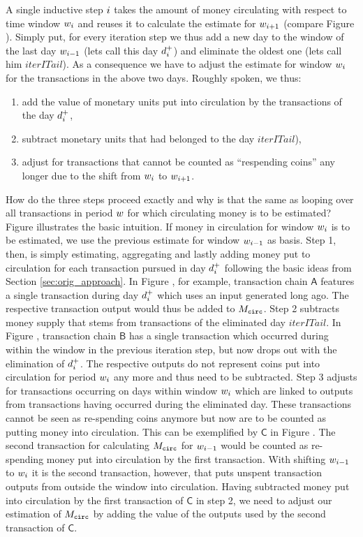 A single inductive step \({i}\) takes the amount of money circulating with respect to time window \({w}_{i}\) and reuses it to calculate the estimate for \({w}_{{i}+1}\) (compare Figure ). %
Simply put, for every iteration step we thus add a new day to the window of the last day \({w}_{{i}-1}\) (lets call this day \({d_{{i}}^{+}}\)) and eliminate the oldest one (lets call him \(iterITail\)). %
As a consequence we have to adjust the estimate for window \({w}_{i}\) for the transactions in the above two days. %
Roughly spoken, we thus:
\begin{enumerate}
\item add the value of monetary units put into circulation by the transactions of the day \({d_{{i}}^{+}}\), %
\item subtract monetary units that had belonged to the day \(iterITail\)), %
\item adjust for transactions that cannot be counted as ``respending coins'' any longer due to the shift from \({w}_{{i}}\) to \({w}_{{i} + 1}\). %
\end{enumerate}
How do the three steps proceed exactly and why is that the same as looping over all transactions in period \({w}\) for which circulating money is to be estimated? %
Figure  illustrates the basic intuition. %
If money in circulation for window \({w}_{{i}}\) is to be estimated, we use the previous estimate for window \({w}_{{i}-1}\) as basis. %
Step 1, then, is simply estimating, aggregating and lastly adding money put to circulation for each transaction pursued in day \({d_{{i}}^{+}}\) following the basic ideas from Section \ref{sec:orig_approach}. %
In Figure , for example, transaction chain \(\mathsf{A}\) features a single transaction during day \({d_{{i}}^{+}}\) which uses an input generated long ago. The respective transaction output would thus be added to \({M_{\mathtt{circ}}}\).
Step 2 subtracts money supply that stems from transactions of the eliminated day \(iterITail\). %
In Figure , transaction chain \(\mathsf{B}\) has a single transaction which occurred during within the window in the previous iteration step, but now drops out with the elimination of \({d_{{i}}^{+}}\). %
The respective outputs do not represent coins put into circulation for period \({w}_{{i}}\) any more and thus need to be subtracted. %
Step 3 adjusts for transactions occurring on days within window \({w}_{i}\) which are linked to outputs from transactions having occurred during the eliminated day. %
These transactions cannot be seen as re-spending coins anymore but now are to be counted as putting money into circulation. %
This can be exemplified by \(\mathsf{C}\) in Figure . %
The second transaction for calculating \({M_{\mathtt{circ}}}\) for \({w}_{{i}-1}\) would be counted as re-spending money put into circulation by the first transaction. %
With shifting \({w}_{{i}-1}\) to \({w}_{{i}}\) it is the second transaction, however, that puts unspent transaction outputs from outside the window into circulation. %
Having subtracted money put into circulation by the first transaction of \(\mathsf{C}\) in step 2, we need to adjust our estimation of \({M_{\mathtt{circ}}}\) by adding the value of the outputs used by the second transaction of \(\mathsf{C}\). %

